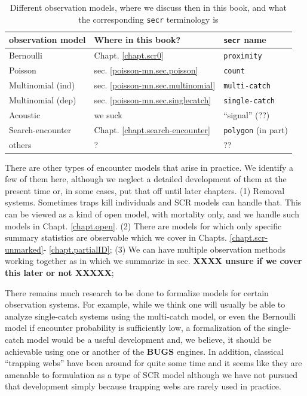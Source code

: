 \begin{table} 
\centering
\caption{
Different observation models, where we discuss then in this
  book, and what the corresponding \mbox{\tt secr} terminology is
}
\begin{tabular}{lll}
\hline \hline
observation model & Where in this book?  &  \mbox{\tt secr} name  \\ \hline
Bernoulli         & Chapt. \ref{chapt.scr0}    &   \mbox{\tt proximity} \\
Poisson           & sec. \ref{poisson-mn.sec.poisson} & \mbox{\tt count} \\
Multinomial (ind) & sec. \ref{poisson-mn.sec.multinomial} & \mbox{\tt  multi-catch} \\
Multinomial (dep) & sec. \ref{poisson-mn.sec.singlecatch} & \mbox{\tt  single-catch} \\
Acoustic          & we suck    &  ``signal'' (??) \\
Search-encounter      & Chapt. \ref{chapt.search-encounter}  & \mbox{\tt polygon} (in part) \\ 
others            & ?          &   ??             \\ \hline
\end{tabular}
\label{poisson-mn.tab.models}
\end{table}

There are other types of encounter models that arise in practice. We
identify a few of them here, although we neglect a detailed
development of them at the present time or, in some cases, put that
off until later chapters.  (1) Removal systems. Sometimes traps kill
individuals and SCR models can handle that. This can be viewed as a
kind of open model, with mortality only, and we handle such models in
Chapt. \ref{chapt.open}.  (2) There are models for which only specific
summary statistics are observable
\citep{chandler_royle:2012,sollmann_etal:2012ecol} which we cover in
Chapts. \ref{chapt.scr-unmarked}- \ref{chapt.partialID}; (3) We can
have multiple observation methods working together as in
\citet{gopalaswamy_etal:2012ecol} which we summarize in sec. {\bf XXXX
  unsure if we cover this later or not XXXXX};

There remains much research to be done to formalize models for certain
observation systems. For example, while we think one will usually be
able to analyze single-catch systems using the multi-catch model, or
even the Bernoulli model if encounter probability is sufficiently low, 
a formalization of the single-catch model would be a useful
development and, we believe, it should be achievable using one or
another of the {\bf BUGS} engines.   In addition, classical ``trapping webs''
\citep{anderson_etal:1983, wilson_anderson:1985b, jett_nichols:1987, 
parmenter_etal:1989} have 
been around for quite some time and it seems like they are amenable to
formulation as a type of SCR model although we have not pursued that development
simply because trapping webs are rarely used in practice. 

